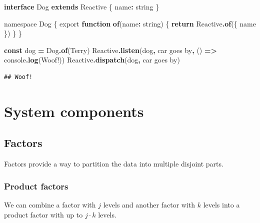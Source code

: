 \documentclass[
]{book}
\newenvironment{Shaded}{\begin{snugshade}}{\end{snugshade}}
\newcommand{\BuiltInTok}[1]{#1}
\newcommand{\ControlFlowTok}[1]{\textcolor[rgb]{0.13,0.29,0.53}{\textbf{#1}}}
\newcommand{\DataTypeTok}[1]{\textcolor[rgb]{0.13,0.29,0.53}{#1}}
\newcommand{\FunctionTok}[1]{\textcolor[rgb]{0.13,0.29,0.53}{\textbf{#1}}}
\newcommand{\ImportTok}[1]{#1}
\newcommand{\KeywordTok}[1]{\textcolor[rgb]{0.13,0.29,0.53}{\textbf{#1}}}
\newcommand{\NormalTok}[1]{#1}
\newcommand{\OperatorTok}[1]{\textcolor[rgb]{0.81,0.36,0.00}{\textbf{#1}}}
\newcommand{\VerbatimStringTok}[1]{\textcolor[rgb]{0.31,0.60,0.02}{#1}}
\theoremstyle{definition}
\theoremstyle{definition}
\theoremstyle{definition}
\theoremstyle{definition}
\theoremstyle{remark}
\begin{document}
\begin{Shaded}
\begin{Highlighting}[]
\KeywordTok{interface}\NormalTok{ Dog }\KeywordTok{extends}\NormalTok{ Reactive \{}
\NormalTok{  name}\OperatorTok{:} \DataTypeTok{string}
\NormalTok{\}}

\ImportTok{namespace} \DataTypeTok{Dog}\NormalTok{ \{}
  \ImportTok{export} \KeywordTok{function} \KeywordTok{of}\NormalTok{(name}\OperatorTok{:} \DataTypeTok{string}\NormalTok{) \{}
    \ControlFlowTok{return}\NormalTok{ Reactive}\OperatorTok{.}\FunctionTok{of}\NormalTok{(\{ name \})}
\NormalTok{  \}}
\NormalTok{\}}

\KeywordTok{const}\NormalTok{ dog }\OperatorTok{=}\NormalTok{ Dog}\OperatorTok{.}\FunctionTok{of}\NormalTok{(}\VerbatimStringTok{\textasciigrave{}Terry\textasciigrave{}}\NormalTok{)}
\NormalTok{Reactive}\OperatorTok{.}\FunctionTok{listen}\NormalTok{(dog}\OperatorTok{,} \VerbatimStringTok{\textasciigrave{}car goes by\textasciigrave{}}\OperatorTok{,}\NormalTok{ () }\KeywordTok{=\textgreater{}} \BuiltInTok{console}\OperatorTok{.}\FunctionTok{log}\NormalTok{(}\VerbatimStringTok{\textasciigrave{}Woof!\textasciigrave{}}\NormalTok{))}
\NormalTok{Reactive}\OperatorTok{.}\FunctionTok{dispatch}\NormalTok{(dog}\OperatorTok{,} \VerbatimStringTok{\textasciigrave{}car goes by\textasciigrave{}}\NormalTok{)}
\end{Highlighting}
\end{Shaded}

\begin{verbatim}
## Woof!
\end{verbatim}

\section{System components}\label{system-components}

\subsection{Factors}\label{factors}

Factors provide a way to partition the data into multiple disjoint parts.

\subsubsection{Product factors}\label{product-factors}

We can combine a factor with \(j\) levels and another factor with \(k\) levels into a product factor with up to \(j \cdot k\) levels.
\end{document}
